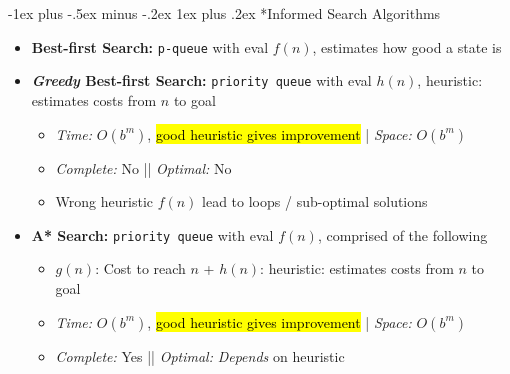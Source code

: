 \documentclass[10pt,landscape]{article}
\makeatletter
\renewcommand{\subsubsection}{\@startsection{subsubsection}{3}{0mm}%
                                {-1ex plus -.5ex minus -.2ex}%
                                {1ex plus .2ex}%
                                {\normalfont\small\bfseries}}
\makeatother
\begin{document}
\begin{multicols*}{3}
\subsubsection*{Informed Search Algorithms}
\begin{itemize}[topsep=0pt,noitemsep,wide=0pt, leftmargin=\dimexpr{} + 2\relax]
  \item \textbf{Best-first Search:} \verb|p-queue| with eval $f(n)$, estimates how good a state is
  \item \textbf{\textit{Greedy} Best-first Search:} \verb|priority queue| with eval $h(n)$, heuristic: estimates costs from $n$ to goal 
  \begin{itemize}[topsep=0pt,noitemsep,wide=0pt, leftmargin=\dimexpr{} + 2\relax]
    \item \textit{Time:} $O(b^m)$, \hl{good heuristic gives improvement} | \textit{Space:} $O(b^m)$
    \item \textit{Complete:} No || \textit{Optimal:} No
    \item Wrong heuristic $f(n)$ lead to loops / sub-optimal solutions
  \end{itemize}
  \item \textbf{A* Search:} \verb|priority queue| with eval $f(n)$, comprised of the following
  \begin{itemize}[topsep=0pt,noitemsep,wide=0pt, leftmargin=\dimexpr{} + 2\relax]
    \item $g(n)$: Cost to reach $n$ + $h(n)$: heuristic: estimates costs from $n$ to goal 
  \end{itemize}
  \begin{itemize}[topsep=0pt,noitemsep,wide=0pt, leftmargin=\dimexpr{} + 2\relax]
    \item \textit{Time:} $O(b^m)$, \hl{good heuristic gives improvement}  | \textit{Space:} $O(b^m)$
    \item \textit{Complete:} Yes || \textit{Optimal:} \textit{Depends} on heuristic
  \end{itemize}
\end{itemize}


\end{multicols*}
\end{document}
